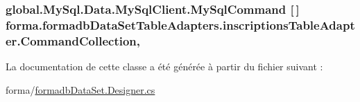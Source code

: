 \subsubsection[{\texorpdfstring{Command\+Collection}{CommandCollection}}]{\setlength{\rightskip}{0pt plus 5cm}global.\+My\+Sql.\+Data.\+My\+Sql\+Client.\+My\+Sql\+Command \mbox{[}$\,$\mbox{]} forma.\+formadb\+Data\+Set\+Table\+Adapters.\+inscriptions\+Table\+Adapter.\+Command\+Collection\hspace{0.3cm}{\ttfamily [get]}, {\ttfamily [protected]}}\hypertarget{classforma_1_1formadb_data_set_table_adapters_1_1inscriptions_table_adapter_a8b117b8b4235b8c53733d33e6d98c97b}{}\label{classforma_1_1formadb_data_set_table_adapters_1_1inscriptions_table_adapter_a8b117b8b4235b8c53733d33e6d98c97b}


La documentation de cette classe a été générée à partir du fichier suivant \+:\begin{DoxyCompactItemize}
\item 
forma/\hyperlink{formadb_data_set_8_designer_8cs}{formadb\+Data\+Set.\+Designer.\+cs}\end{DoxyCompactItemize}
